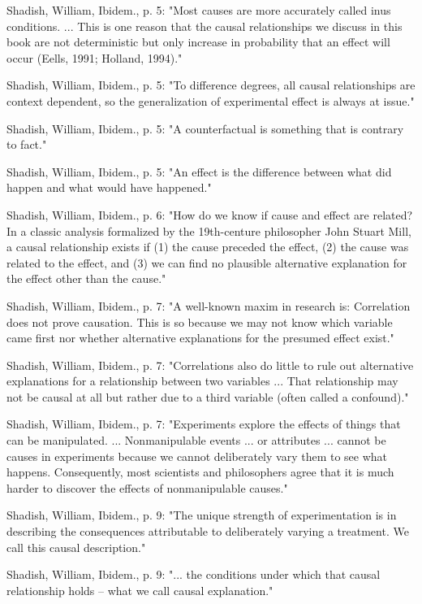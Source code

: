 Shadish, William, Ibidem., p. 5: "Most causes are more accurately called inus conditions. ... This is one reason that the causal relationships we discuss in this book are not deterministic but only increase in probability that an effect will occur (Eells, 1991; Holland, 1994)."

Shadish, William, Ibidem., p. 5: "To difference degrees, all causal relationships are context dependent, so the generalization of experimental effect is always at issue."

Shadish, William, Ibidem., p. 5: "A counterfactual is something that is contrary to fact."

Shadish, William, Ibidem., p. 5: "An effect is the difference between what did happen and what would have happened."

Shadish, William, Ibidem., p. 6: "How do we know if cause and effect are related? In a classic analysis formalized by the 19th-centure philosopher John Stuart Mill, a causal relationship exists if (1) the cause preceded the effect, (2) the cause was related to the effect, and (3) we can find no plausible alternative explanation for the effect other than the cause."

Shadish, William, Ibidem., p. 7: "A well-known maxim in research is: Correlation does not prove causation. This is so because we may not know which variable came first nor whether alternative explanations for the presumed effect exist."

Shadish, William, Ibidem., p. 7: "Correlations also do little to rule out alternative explanations for a relationship between two variables ... That relationship may not be causal at all but rather due to a third variable (often called a confound)."

Shadish, William, Ibidem., p. 7: "Experiments explore the effects of things that can be manipulated. ... Nonmanipulable events ... or attributes ... cannot be causes in experiments because we cannot deliberately vary them to see what happens. Consequently, most scientists and philosophers agree that it is much harder to discover the effects of nonmanipulable causes."

Shadish, William, Ibidem., p. 9: "The unique strength of experimentation is in describing the consequences attributable to deliberately varying a treatment. We call this causal description."

Shadish, William, Ibidem., p. 9: "... the conditions under which that causal relationship holds -- what we call causal explanation."

